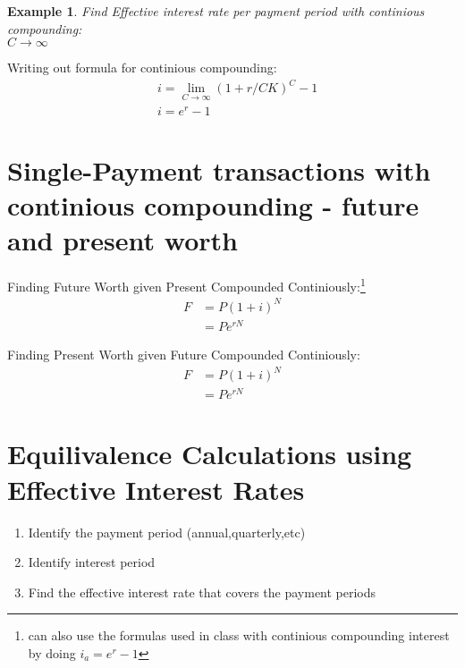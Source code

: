 \documentclass{report} %
\newtheorem{exmp}{Example}
\begin{document}
\begin{exmp}
    Find Effective interest rate per payment period with continious compounding: \\
    $C \rightarrow \infty$
\end{exmp}
Writing out formula for continious compounding:
\begin{equation*}
    \begin{aligned}
        &i = \lim_{C \rightarrow \infty}(1+r/CK)^C - 1 \\
        &i = e^r - 1
    \end{aligned}
\end{equation*}

\section*{Single-Payment transactions with continious compounding - future and present worth}

Finding Future Worth given Present Compounded Continiously:\footnote{can also use the formulas used in class with continious compounding interest by doing $i_a = e^r-1$}
\begin{equation*}
    \begin{aligned}
        F &= P(1+i)^N \\
          &= Pe^{rN}
    \end{aligned}
\end{equation*}

Finding Present Worth given Future Compounded Continiously:
\begin{equation*}
    \begin{aligned}
        F &= P(1+i)^N \\
          &= Pe^{rN}
    \end{aligned}
\end{equation*}

\section*{Equilivalence Calculations using Effective Interest Rates}
\begin{enumerate}
    \item Identify the payment period (annual,quarterly,etc)
    \item Identify interest period
    \item Find the effective interest rate that covers the payment periods
\end{enumerate}
\end{document}
